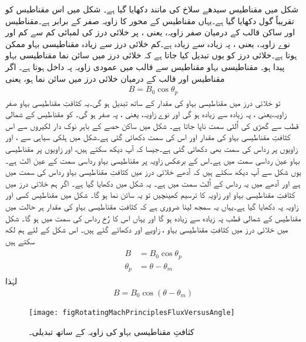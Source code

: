 شکل   میں مقناطیس سیدھے سلاخ کی مانند دکھایا گیا ہے۔ شکل   میں اس مقناطیس کو تقریباً گول دکھایا گیا ہے۔یہاں مقناطیس کے محور کا زاویہ  صفر کے برابر ہے۔مقناطیس اور ساکن قالب کے درمیان صفر زاویہ، یعنی   ، پر خلائی درز کی لمبائی کم سے کم اور نوے  زاویہ، یعنی  ، پہ زیادہ سے زیادہ ہے۔کم خلائی درز سے زیادہ مقناطیسی بہاو ممکن ہوتا ہے۔خلائی درز کو یوں تبدیل کیا جاتا ہے کہ  خلائی درز میں سائن نما مقناطیسی بہاو پیدا ہو۔ مقناطیسی بہاو مقناطیس سے قالب میں عمودی زاویہ پہ داخل ہوتا ہے۔  اگر مقناطیس اور قالب کے درمیان خلائی درز میں  سائن نما ہو، یعنی
\begin{align}
B=B_0 \cos \theta_p
\end{align}
تو خلائی درز میں مقناطیسی بہاو  کی مقدار  کے ساتھ تبدیل ہو گی۔یہ کثافتِ مقناطیسی بہاو صفر زاویہ،یعنی ، پہ زیادہ سے زیادہ ہو گی اور نوے زاویہ، یعنی  ، پہ صفر ہو گی۔ کو مقناطیس کے شمالی قطب  سے گھڑی کی اُلٹی سمت ناپا جاتا ہے۔  شکل   میں  ساکن حصے کے باہر نوک دار لکیروں سے اس کثافتِ مقناطیسی بہاو کی مقدار اور اس کی سمت دکھائی گئی ہے۔شکل میں ہلکی سیاہی سے ،  اور  زاویوں پر رداس کی سمت بھی دکھائی گئی ہے۔جیسا کہ آپ دیکھ سکتے ہیں، اور   زاویوں پر مقناطیسی بہاو عین رداسی سمت میں ہے۔اس کے برعکس زاویہ  پر مقناطیسی بہاو رداسی سمت کے عین الٹ ہے۔یوں شکل سے آپ دیکھ سکتے ہیں کہ  آدھے خلائی درز میں کثافتِ مقناطیسی بہاو  رداس کی سمت میں ہے اور آدھے میں یہ رداس کے اُلٹ سمت میں ہے۔  یہ شکل میں دکھایا گیا ہے۔ اگر ہم خلائی درز میں کثافتِ مقناطیسی بہاو  اور  زاویہ  کا ترسیم کھینچیں تو یہ سائن نما ہو گا۔ شکل   میں مقناطیس کسی اور زاویہ پہ دکھایا گیا ہے۔یہاں یہ سمجھ لینا ضروری ہے کہ کثافتِ مقناطیسی بہاو کی مقدار  ہر حالت میں مقناطیس کے شمالی قطب پہ زیادہ سے زیادہ ہو گا اور یہاں اس کا رُخ رداس کی  سمت میں ہو گا۔ شکل  میں خلائی درز میں کثافتِ مقناطیسی بہاو ، زاویے  اور  دکھائے گئے ہیں۔ اس شکل کے لئے ہم لکھ سکتے ہیں
\begin{gather}
\begin{aligned}\label{مساوات_گھومتے_مشین_کثافت_بالمقابل_میکانی_زاویہ}
B&=B_0 \cos \theta_p\\
\theta_p&=\theta-\theta_m
\end{aligned}
\end{gather}
لہٰذا
\begin{align}
B=B_0 \cos (\theta-\theta_m)
\end{align}
%
\begin{figure}
\centering
\texttt{[image: figRotatingMachPrinciplesFluxVersusAngle]}
\caption{کثافتِ مقناطیسی بہاو کی زاویہ کے ساتھ تبدیلی۔}
\label{شکل_گھومتے_مشین_رداس_اور_مقناطیسی_بہاو}
\end{figure}

